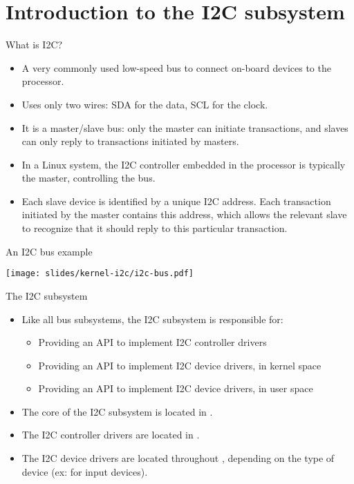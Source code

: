 \section{Introduction to the I2C subsystem}

\begin{frame}{What is I2C?}
  \begin{itemize}
  \item A very commonly used low-speed bus to connect on-board
    devices to the processor.
  \item Uses only two wires: SDA for the data, SCL for the clock.
  \item It is a master/slave bus: only the master can initiate
    transactions, and slaves can only reply to transactions initiated
    by masters.
  \item In a Linux system, the I2C controller embedded in the
    processor is typically the master, controlling the bus.
  \item Each slave device is identified by a unique I2C address. Each
    transaction initiated by the master contains this address, which
    allows the relevant slave to recognize that it should reply to
    this particular transaction.
  \end{itemize}
\end{frame}

\begin{frame}{An I2C bus example}
  \begin{center}
    \texttt{[image: slides/kernel-i2c/i2c-bus.pdf]}
  \end{center}
\end{frame}

\begin{frame}{The I2C subsystem}
  \begin{itemize}
  \item Like all bus subsystems, the I2C subsystem is responsible for:
    \begin{itemize}
    \item Providing an API to implement I2C controller drivers
    \item Providing an API to implement I2C device drivers, in kernel space
    \item Providing an API to implement I2C device drivers, in user space
    \end{itemize}
  \item The core of the I2C subsystem is located in
    .
  \item The I2C controller drivers are located in
    .
  \item The I2C device drivers are located throughout
    , depending on the type of device (ex:
     for input devices).
  \end{itemize}
\end{frame}

